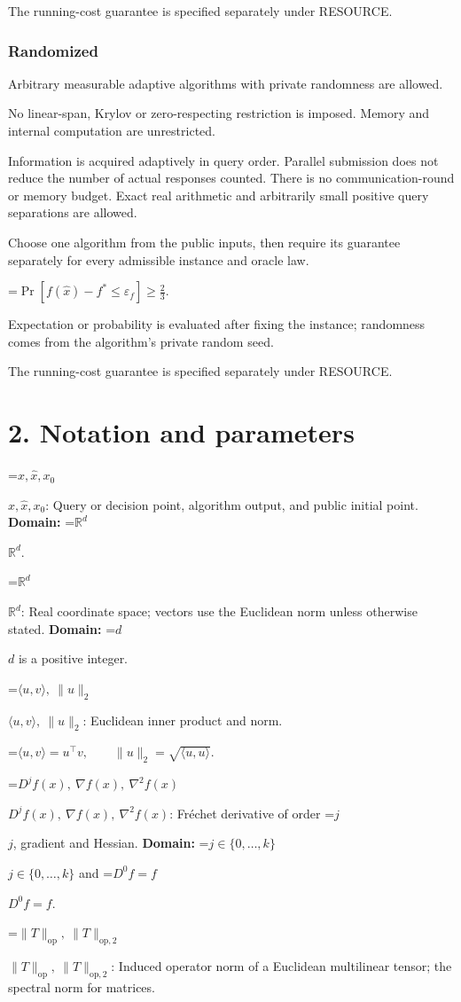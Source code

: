 \documentclass[10pt,a4paper]{article}
\newcommand{\AtlasMath}[1]{\par\begingroup\centering\setbox0=\hbox{$\displaystyle #1$}\ifdim\wd0>1.4\linewidth\typeout{ATLAS WIDE FORMULA: \the\wd0}\fi\ifdim\wd0>\linewidth\resizebox{\linewidth}{!}{\box0}\else\box0\fi\par\endgroup}
\newcommand{\AtlasInlineMath}[1]{\begingroup\setbox0=\hbox{$#1$}\ifdim\wd0>.4\linewidth\endgroup\AtlasMath{#1}\else\endgroup$#1$\fi}
\begin{document}
The running-cost guarantee is specified separately under RESOURCE.

\subsubsection{Randomized}
Arbitrary measurable adaptive algorithms with private randomness are allowed.

No linear-span, Krylov or zero-respecting restriction is imposed. Memory and internal computation are unrestricted.

Information is acquired adaptively in query order. Parallel submission does not reduce the number of actual responses counted. There is no communication-round or memory budget. Exact real arithmetic and arbitrarily small positive query separations are allowed.

Choose one algorithm from the public inputs, then require its guarantee separately for every admissible instance and oracle law.


\AtlasMath{\Pr\!\left[f(\widehat{x})-f^*\le \varepsilon_f\right]\ge\frac23.}


Expectation or probability is evaluated after fixing the instance; randomness comes from the algorithm's private random seed.

The running-cost guarantee is specified separately under RESOURCE.

\section{2. Notation and parameters}
\AtlasInlineMath{x,\widehat{x},x_0}: Query or decision point, algorithm output, and public initial point. \textbf{Domain:} \AtlasInlineMath{\mathbb{R}^d}.

\AtlasInlineMath{\mathbb{R}^d}: Real coordinate space; vectors use the Euclidean norm unless otherwise stated. \textbf{Domain:} \AtlasInlineMath{d} is a positive integer.

\AtlasInlineMath{\langle u,v\rangle,\ \|u\|_2}: Euclidean inner product and norm.


\AtlasMath{\langle u,v\rangle=u^\top v,\qquad\|u\|_2=\sqrt{\langle u,u\rangle}.}


\AtlasInlineMath{D^jf(x),\ \nabla f(x),\ \nabla^2f(x)}: Fréchet derivative of order \AtlasInlineMath{j}, gradient and Hessian. \textbf{Domain:} \AtlasInlineMath{j\in\{0,\ldots,k\}} and \AtlasInlineMath{D^0f=f}.

\AtlasInlineMath{\|T\|_{\mathrm{op}},\ \|T\|_{\mathrm{op},2}}: Induced operator norm of a Euclidean multilinear tensor; the spectral norm for matrices.
\end{document}
